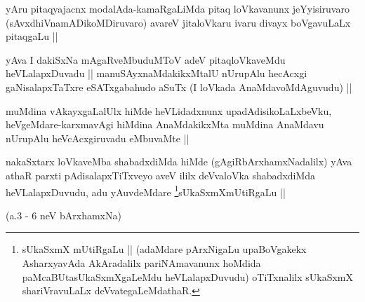 \begin{artha}
yAru pitaqyajacnx modalAda-kamaRgaLiMda pitaq loVkavanunx
jeYyisiruvaro (sAvxdhiVnamADikoMDiruvaro) avareV jitaloVkaru ivaru
divayx boVgavuLaLx pitaqgaLu ||
\end{artha}


\begin{artha}
yAva I dakiSxNa mAgaRveMbuduMToV adeV pitaqloVkaveMdu heVLalapxDuvadu
|| manuSAyxnaMdakikxMtalU nUrupAlu hecAcxgi gaNisalapxTaTxre
eSATxgabahudo aSuTx (I loVkada AnaMdavoMdAguvudu) ||
\end{artha}


\begin{artha}
muMdina vAkayxgaLalUlx hiMde heVLidadxnunx upadAdisikoLaLxbeVku,
heVgeMdare-karxmavAgi hiMdina AnaMdakikxMta muMdina AnaMdavu nUrupAlu
heVcAcxgiruvadu eMbuvaMte ||
\end{artha}


\begin{artha}
nakaSxtarx loVkaveMba shabadxdiMda hiMde (gAgiRbArxhamxNadalilx) yAva
athaR parxti pAdisalapxTiTxveyo aveV ililx deVvaloVka shabadxdiMda
heVLalapxDuvudu, adu yAuvdeMdare \footnote[1]{sUkaSxmX mUtiRgaLu ||
  (adaMdare pArxNigaLu upaBoVgakekx AsharxyavAda AkAradalilx
  pariNAmavanunx hoMdida paMcaBUtasUkaSxmXgaLeMdu heVLalapxDuvudu)
  oTiTxnalilx sUkaSxmX shariVravuLaLx deVvategaLeMdathaR.}sUkaSxmXmUtiRgaLu ||
\end{artha}

(a.3 - 6 neV bArxhamxNa)  
